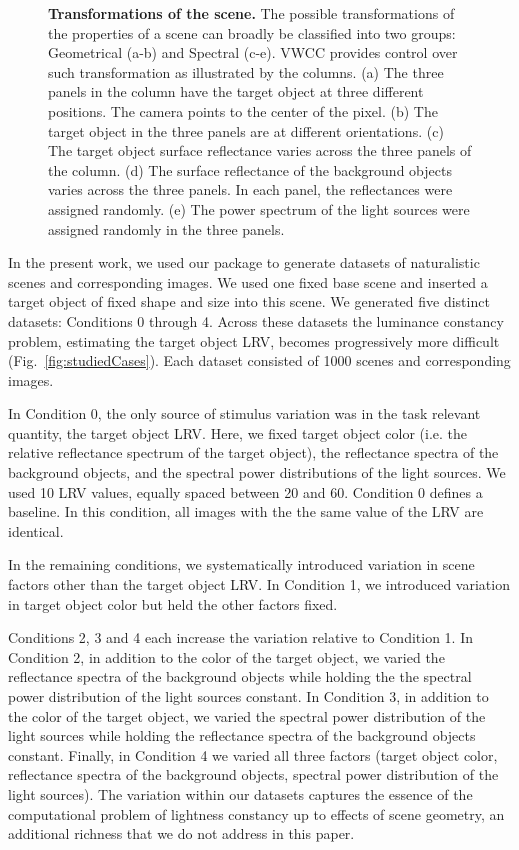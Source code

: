 \documentclass{jov}
\begin{document}
\begin{figure}
\begin{subfigure}[b]{0.18 \textwidth}
        \label{fig:illuminationVariation}
    \end{subfigure}
    \caption{{\bf Transformations of the scene.} The possible transformations of the properties of a scene can broadly be classified into two groups: Geometrical (a-b) and Spectral (c-e). VWCC provides control over such transformation as illustrated by the columns. (a) The three panels in the column have the target object at three different positions. The camera points to the center of the pixel. (b) The target object in the three panels are at different orientations. (c) The target object surface reflectance varies across the three panels of the column. (d) The surface reflectance of the background objects varies across the three panels. In each panel, the reflectances were assigned randomly. (e) The power spectrum of the light sources were assigned randomly in the three panels. 
\label{fig:VWCCTransformations}}
\end{figure}

In the present work, we used our package to generate datasets of naturalistic scenes and corresponding images.
We used one fixed base scene and inserted a target object of fixed shape and size into this scene.
We generated five distinct datasets: Conditions 0 through 4.
Across these datasets the luminance constancy problem, estimating the target object LRV,
becomes progressively more difficult (Fig.~\ref{fig:studiedCases}).
Each dataset consisted of 1000 scenes and corresponding images.

In Condition 0, the only source of stimulus variation was in the task relevant quantity, the target object LRV.
Here, we fixed target object color (i.e. the relative reflectance spectrum of the target object),
the reflectance spectra of the background objects, and the spectral power distributions of the light sources.
We used 10 LRV values, equally spaced between 20 and 60.
Condition 0 defines a baseline. In this condition, all images with the the same value of the LRV are identical.

In the remaining conditions, we systematically introduced variation in scene factors other than the target object LRV.
In Condition 1, we introduced variation in target object color but held the other factors fixed.

Conditions 2, 3 and 4 each increase the variation relative to Condition 1.
In Condition 2, in addition to the color of the target object,
we varied the reflectance spectra of the background objects
while holding the the spectral power distribution of the light sources
constant.
In Condition 3, in addition to the color of the target object,
we varied the spectral power distribution of the light sources
while holding the reflectance spectra of the background objects constant.
Finally, in Condition 4 we varied all three factors (target object color,
reflectance spectra of the background objects, spectral power distribution of the light sources).
The variation within our datasets captures the essence of the computational problem of lightness constancy
up to effects of scene geometry, an additional richness that we do not address in this paper.
\end{document}
